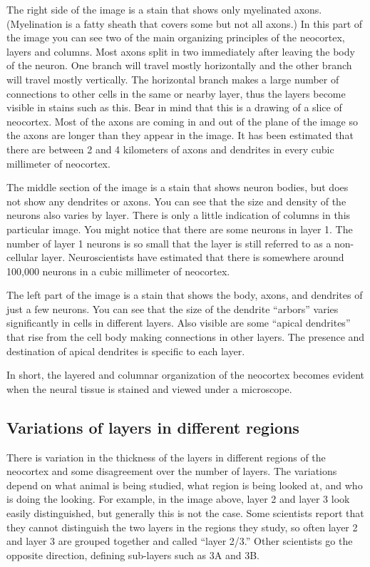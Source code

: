\documentclass{report}
\begin{document}
The right side of the image is a stain that shows only myelinated
axons.  (Myelination is a fatty sheath that covers some but not all
axons.) In this part of the image you can see two of the main
organizing principles of the neocortex, layers and columns. Most axons
split in two immediately after leaving the body of the neuron. One
branch will travel mostly horizontally and the other branch will
travel mostly vertically. The horizontal branch makes a large number
of connections to other cells in the same or nearby layer, thus the
layers become visible in stains such as this. Bear in mind that this
is a drawing of a slice of neocortex. Most of the axons are coming in
and out of the plane of the image so the axons are longer than they
appear in the image. It has been estimated that there are between 2
and 4 kilometers of axons and dendrites in every cubic millimeter of
neocortex.

The middle section of the image is a stain that shows neuron bodies,
but does not show any dendrites or axons. You can see that the size
and density of the neurons also varies by layer. There is only a
little indication of columns in this particular image. You might
notice that there are some neurons in layer 1. The number of layer 1
neurons is so small that the layer is still referred to as a
non-cellular layer. Neuroscientists have estimated that there is
somewhere around 100,000 neurons in a cubic millimeter of neocortex.

The left part of the image is a stain that shows the body, axons, and
dendrites of just a few neurons. You can see that the size of the
dendrite ``arbors'' varies significantly in cells in different
layers. Also visible are some ``apical dendrites'' that rise from the
cell body making connections in other layers. The presence and
destination of apical dendrites is specific to each layer.

In short, the layered and columnar organization of the neocortex
becomes evident when the neural tissue is stained and viewed under a
microscope.

\subsection*{Variations of layers in different regions}
There is variation in the thickness of the layers in different regions
of the neocortex and some disagreement over the number of layers. The
variations depend on what animal is being studied, what region is
being looked at, and who is doing the looking. For example, in the
image above, layer 2 and layer 3 look easily distinguished, but
generally this is not the case. Some scientists report that they
cannot distinguish the two layers in the regions they study, so often
layer 2 and layer 3 are grouped together and called ``layer 2/3.''
Other scientists go the opposite direction, defining sub-layers such
as 3A and 3B.
\end{document}
